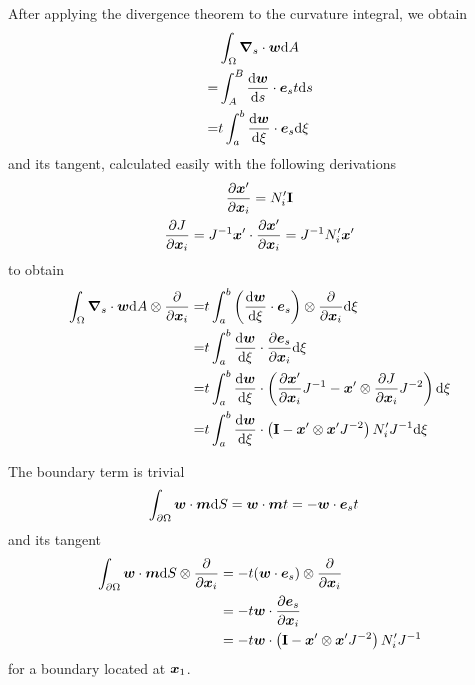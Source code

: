 \documentclass[a4paper,11pt]{article}
\renewcommand{\to}[1]{\text{\boldmath $#1$}} %
\newcommand{\ts}[1]{\text{\boldmath $\rm #1$}} %
\newcommand{\intd}[1]{{\rm d}#1}
\newcommand{\pderiv}[2]{\frac{\partial#1}{\partial#2}}
\newcommand{\dderiv}[2]{\frac{{\rm d}#1}{{\rm d}#2}}
\begin{document}
After applying the divergence theorem to the curvature integral, we obtain
\begin{align}
  &\int_\Omega\to \nabla_s\cdot\to w\intd A\\
 =&\int_A^B\dderiv{\to w}{s}\cdot\to e_s t \intd s\\
 =&t \int_a^b \dderiv{\to w}{\xi}\cdot \to e_s \intd\xi\\
\end{align}
and its tangent, calculated easily with the following derivations
\begin{gather}
 \pderiv{\to x'}{\to x_i} = N_i' \ts I\\
 \pderiv{J}{\to x_i} = J^{-1} \to x'\cdot \pderiv{\to x'}{\to x_i} = J^{-1} N_i' \to x'
\end{gather}
to obtain
\begin{align}
 \int_\Omega\to \nabla_s\cdot\to w\intd A \otimes \pderiv{}{\to x_i}
 =&t \int_a^b \left(\dderiv{\to w}{\xi}\cdot \to e_s\right)\otimes \pderiv{}{\to x_i}  \intd\xi\\
 =&t \int_a^b \dderiv{\to w}{\xi}\cdot \pderiv{\to e_s}{\to x_i} \intd\xi\\
 =&t \int_a^b \dderiv{\to w}{\xi}\cdot \left(\pderiv{\to x'}{\to x_i}J^{-1}-\to x'\otimes\pderiv{J}{\to x_i}J^{-2}\right) \intd\xi\\
 =&t \int_a^b \dderiv{\to w}{\xi}\cdot \left(\ts I-\to x'\otimes\to x' J^{-2}\right)N_i' J^{-1} \intd\xi
\end{align}

The boundary term is trivial
\begin{align}
 &\int_{\partial\Omega} \to w\cdot \to m\intd S = \to w \cdot\to m t = - \to w \cdot \to e_s t
\end{align}
and its tangent
\begin{align}
 \int_{\partial\Omega} \to w\cdot \to m\intd S\otimes \pderiv{}{\to x_i} &= -t(\to w \cdot \to e_s)\otimes \pderiv{}{\to x_i}\\
 &= -t \to w\cdot\pderiv{\to e_s}{\to x_i}\\
 &= -t \to w\cdot \left(\ts I-\to x'\otimes\to x' J^{-2}\right)N_i' J^{-1}
\end{align}
for a boundary located at $\to x_1$.
\end{document}
